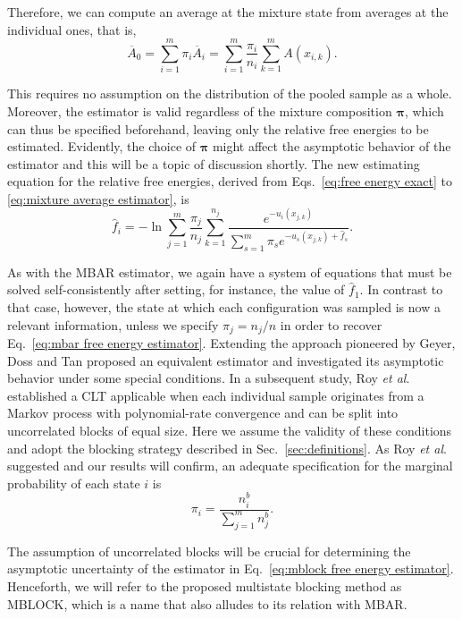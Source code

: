 \documentclass[aip,jcp,reprint,amsmath,amssymb]{revtex4-1}
\newcommand{\vt}[1]{\boldsymbol{\mathbf{#1}}}           %
\begin{document}
Therefore, we can compute an average at the mixture state from averages at the individual ones, that is,
\begin{equation}
\label{eq:mixture average estimator}
{\overline A}_0 = \sum_{i=1}^m \pi_i \overline{A}_i = \sum_{i=1}^m \frac{\pi_i}{n_i} \sum_{k=1}^m A(x_{i,k}).
\end{equation}

This requires no assumption on the distribution of the pooled sample as a whole. Moreover, the estimator is valid regardless of the mixture composition $\vt \pi$, which can thus be specified beforehand, leaving only the relative free energies to be estimated. Evidently, the choice of $\vt \pi$ might affect the asymptotic behavior of the estimator and this will be a topic of discussion shortly. The new estimating equation for the relative free energies, derived from Eqs.~\eqref{eq:free energy exact} to \eqref{eq:mixture average estimator}, is
\begin{equation}
\label{eq:mblock free energy estimator}
{\hat f}_i = -\ln \sum_{j=1}^m \frac{\pi_j}{n_j} \sum_{k=1}^{n_j} \frac{e^{-u_i(x_{j,k})}}{\sum_{s=1}^m \pi_s e^{-u_s(x_{j,k}) + {\hat f}_s}}.
\end{equation}

As with the MBAR estimator, we again have a system of equations that must be solved self-consistently after setting, for instance, the value of $\hat f_1$. In contrast to that case, however, the state at which each configuration was sampled is now a relevant information, unless we specify $\pi_j = {n_j}/{n}$ in order to recover Eq.~\eqref{eq:mbar free energy estimator}. Extending the approach pioneered by Geyer,\cite{Geyer_1994} Doss and Tan\cite{Doss_2014} proposed an equivalent estimator and investigated its asymptotic behavior under some special conditions. In a subsequent study, Roy \textit{et al}.\cite{Roy_2018} established a CLT applicable when each individual sample originates from a Markov process with polynomial-rate convergence and can be split into uncorrelated blocks of equal size. Here we assume the validity of these conditions and adopt the blocking strategy described in Sec.~\ref{sec:definitions}. As Roy \textit{et al}.\cite{Roy_2018} suggested and our results will confirm, an adequate specification for the marginal probability of each state $i$ is
\begin{equation}
\label{eq:mblock prior}
\pi_i = \frac{n^b_i}{\sum_{j=1}^m n^b_j}.
\end{equation}

The assumption of uncorrelated blocks will be crucial for determining the asymptotic uncertainty of the estimator in Eq.~\eqref{eq:mblock free energy estimator}. Henceforth, we will refer to the proposed multistate blocking method as MBLOCK, which is a name that also alludes to its relation with MBAR.
\end{document}
